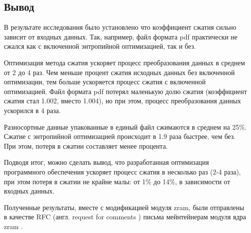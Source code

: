 \subsection{Вывод}

В результате исследования было установлено что коэффициент сжатия сильно зависит от входных данных. Так, например, файл формата pdf практически не сжался как с включенной энтропийной оптимизацией, так и без.

Оптимизация метода сжатия ускоряет процесс преобразования данных в среднем от 2 до 4 раз. Чем меньше процент сжатия исходных данных без включенной оптимизации, тем больше ускоряется процесс сжатия с включенной оптимизацией. Файл формата pdf потерял маленькую долю сжатия (коэффициент сжатия стал 1.002, вместо 1.004), но при этом, процесс преобразования данных ускорился в 4 раза.

Разносортные данные упакованные в единый файл сжимаются в среднем на 25\%. Сжатие с энтропийной оптимизацией происходит в 1.9 раза быстрее, чем без. При этом, потеря в сжатии составляет менее процента.

Подводя итог, можно сделать вывод, что разработанная оптимизация программного обеспечения ускоряет процесс сжатия в несколько раз (2-4 раза), при этом потеря в сжатии не крайне малы: от 1\% до 14\%, в зависимости от входных данных. 

Полученные результаты, вместе с модификацией модуля zram, были отправлены в качестве RFC (англ. request for comments \cite{rfc}) письма мейнтейнерам модуля ядра zram \cite{rfc-patch-kernel}.

\pagebreak